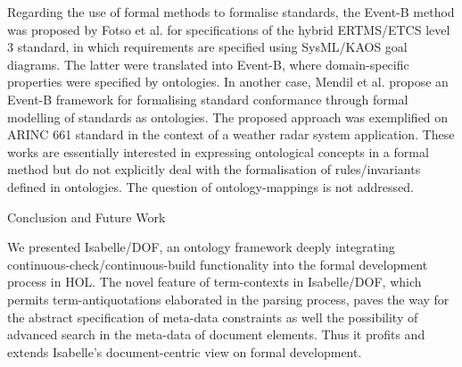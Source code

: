 \begin{isabellebody}
\begin{isamarkuptext}
Regarding the use of formal methods to formalise standards, the Event-B method was proposed by
Fotso et al. \cite{FotsoFLM18} for specifications of the hybrid ERTMS/ETCS level 3 standard,
in which requirements are specified using SysML/KAOS goal diagrams. The latter were translated into 
Event-B, where domain-specific properties were specified by ontologies.
In another case, Mendil et al. \cite{MendilASMP21} propose an Event-B framework for formalising standard
 conformance through formal modelling of standards as ontologies. 
The proposed approach was exemplified on ARINC 661 standard
in the context of a weather radar system application.
These works are essentially interested in expressing ontological concepts in a formal method 
but do not explicitly deal with the formalisation of rules/invariants defined in ontologies. 
The question of ontology-mappings is not addressed.

%
\end{isamarkuptext}\isamarkuptrue%

\begin{isamarkupsection*}
[label = {concl},type = {scholarly_paper.conclusion}, args={label = {concl},type = {scholarly_paper.conclusion}, Isa_COL.text_element.level = {}, Isa_COL.text_element.referentiable = {False}, Isa_COL.text_element.variants = {{STR ''outline'', STR ''document''}}, scholarly_paper.text_section.main_author = {}, scholarly_paper.text_section.fixme_list = {}, Isa_COL.text_element.level = {}, scholarly_paper.text_section.main_author = {}}]Conclusion and Future Work
\end{isamarkupsection*}\isamarkuptrue%

\begin{isamarkuptext}
We presented Isabelle/DOF, an ontology framework 
deeply integrating continuous-check\slash continuous-build functionality into
the formal development process in HOL. The novel feature of term-contexts in Isabelle/DOF,
which permits term-antiquotations elaborated in the parsing process, paves the
way for the abstract specification of meta-data constraints as well the possibility
of advanced search in the meta-data of document elements. Thus it profits and
extends  Isabelle's document-centric view on formal development.


\end{isamarkuptext}
\end{isabellebody}
